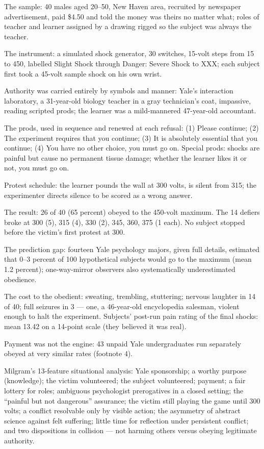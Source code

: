 \begin{distilled}
  \item The sample: 40 males aged 20--50, New Haven area, recruited by newspaper advertisement, paid \$4.50 and told the money was theirs no matter what; roles of teacher and learner assigned by a drawing rigged so the subject was always the teacher.
  \item The instrument: a simulated shock generator, 30 switches, 15-volt steps from 15 to 450, labelled Slight Shock through Danger: Severe Shock to XXX; each subject first took a 45-volt sample shock on his own wrist.
  \item Authority was carried entirely by symbols and manner: Yale's interaction laboratory, a 31-year-old biology teacher in a gray technician's coat, impassive, reading scripted prods; the learner was a mild-mannered 47-year-old accountant.
  \item The prods, used in sequence and renewed at each refusal: (1) Please continue; (2) The experiment requires that you continue; (3) It is absolutely essential that you continue; (4) You have no other choice, you must go on. Special prods: shocks are painful but cause no permanent tissue damage; whether the learner likes it or not, you must go on.
  \item Protest schedule: the learner pounds the wall at 300 volts, is silent from 315; the experimenter directs silence to be scored as a wrong answer.
  \item The result: 26 of 40 (65 percent) obeyed to the 450-volt maximum. The 14 defiers broke at 300 (5), 315 (4), 330 (2), 345, 360, 375 (1 each). No subject stopped before the victim's first protest at 300.
  \item The prediction gap: fourteen Yale psychology majors, given full details, estimated that 0--3 percent of 100 hypothetical subjects would go to the maximum (mean 1.2 percent); one-way-mirror observers also systematically underestimated obedience.
  \item The cost to the obedient: sweating, trembling, stuttering; nervous laughter in 14 of 40; full seizures in 3 --- one, a 46-year-old encyclopedia salesman, violent enough to halt the experiment. Subjects' post-run pain rating of the final shocks: mean 13.42 on a 14-point scale (they believed it was real).
  \item Payment was not the engine: 43 unpaid Yale undergraduates run separately obeyed at very similar rates (footnote 4).
  \item Milgram's 13-feature situational analysis: Yale sponsorship; a worthy purpose (knowledge); the victim volunteered; the subject volunteered; payment; a fair lottery for roles; ambiguous psychologist prerogatives in a closed setting; the ``painful but not dangerous'' assurance; the victim still playing the game until 300 volts; a conflict resolvable only by visible action; the asymmetry of abstract science against felt suffering; little time for reflection under persistent conflict; and two dispositions in collision --- not harming others versus obeying legitimate authority.
\end{distilled}
